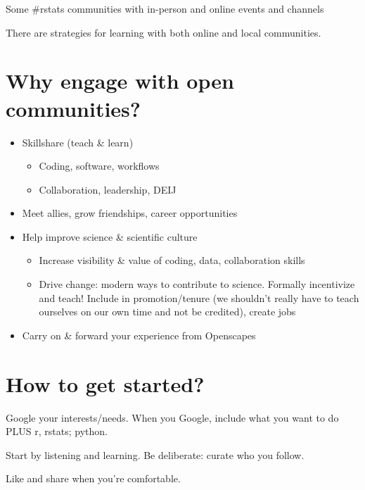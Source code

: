 \documentclass[
  letterpaper,
  DIV=11,
  numbers=noendperiod]{scrreprt}
\providecommand{\tightlist}{%
  \setlength{\itemsep}{0pt}\setlength{\parskip}{0pt}}
\begin{document}
Some \#rstats communities with in-person and online events and channels

There are strategies for learning with both online and local
communities.

\hypertarget{why-engage-with-open-communities}{%
\section{Why engage with open
communities?}\label{why-engage-with-open-communities}}

\begin{itemize}
\tightlist
\item
  Skillshare (teach \& learn)

  \begin{itemize}
  \tightlist
  \item
    Coding, software, workflows
  \item
    Collaboration, leadership, DEIJ
  \end{itemize}
\item
  Meet allies, grow friendships, career opportunities
\item
  Help improve science \& scientific culture

  \begin{itemize}
  \tightlist
  \item
    Increase visibility \& value of coding, data, collaboration skills
  \item
    Drive change: modern ways to contribute to science. Formally
    incentivize and teach! Include in promotion/tenure (we shouldn't
    really have to teach ourselves on our own time and not be credited),
    create jobs
  \end{itemize}
\item
  Carry on \& forward your experience from Openscapes
\end{itemize}

\hypertarget{how-to-get-started}{%
\section{How to get started?}\label{how-to-get-started}}

Google your interests/needs. When you Google, include what you want to
do PLUS r, rstats; python.

Start by listening and learning. Be deliberate: curate who you follow.

Like and share when you're comfortable.
\end{document}
